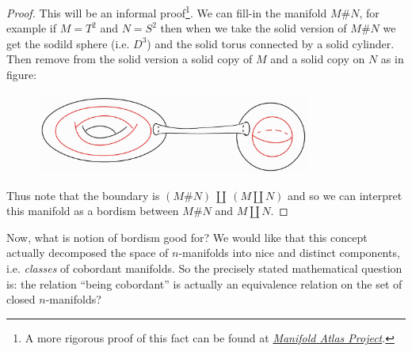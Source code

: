 \begin{proof} 
    This will be an informal proof\footnote{A more rigorous proof of this fact can be found at \href{http://www.map.mpim-bonn.mpg.de/Bordism\#Connected_sum_and_bordism }{\textit{Manifold Atlas Project}}.}. We can fill-in the manifold $M\# N$, for example if $M=T^2$ and $N=S^2$ then when we take the solid version of $M\# N$ we get the sodild sphere (i.e. $D^3$) and the solid torus connected by a solid cylinder. Then remove from the solid version a solid copy of $M$ and a solid copy on $N$ as in figure:\\
    \begin{figure}[!ht]
    \centering
    \captionsetup{labelformat=empty, format = hang}
        \begin{measuredfigure}
            \includegraphics[width=9cm]{images/Lecture 2/bordism_connected_sum.png}
        \end{measuredfigure}
    \end{figure}

    \noindent Thus note that the boundary is $(M\# N) \ \coprod \ (M\coprod N)$ and so we can interpret this manifold as a bordism between $M\# N$ and $M\coprod N$.
\end{proof}

Now, what is notion of bordism good for? We would like that this concept actually decomposed the space of $n$-manifolds into nice and distinct components, i.e. \textit{classes} of cobordant manifolds. So the precisely stated mathematical question is: the relation ``being cobordant'' is actually an equivalence relation on the set of closed $n$-manifolds?

